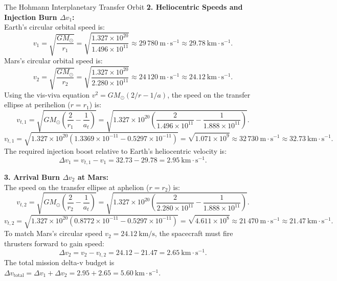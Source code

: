 \begin{workedexample}{The Hohmann Interplanetary Transfer Orbit}
\textbf{2. Heliocentric Speeds and Injection Burn $\Delta v_1$:}\\
Earth's circular orbital speed is:
\[
v_1 = \sqrt{\frac{G M_\odot}{r_1}} = \sqrt{\frac{1.327\times 10^{20}}{1.496\times 10^{11}}} \approx 29\,780\ \mathrm{m\cdot s^{-1}} \approx 29.78\ \mathrm{km\cdot s^{-1}}.
\]
Mars's circular orbital speed is:
\[
v_2 = \sqrt{\frac{G M_\odot}{r_2}} = \sqrt{\frac{1.327\times 10^{20}}{2.280\times 10^{11}}} \approx 24\,120\ \mathrm{m\cdot s^{-1}} \approx 24.12\ \mathrm{km\cdot s^{-1}}.
\]
Using the vis-viva equation $v^2 = G M_\odot(2/r - 1/a)$, the speed on the transfer ellipse at perihelion ($r = r_1$) is:
\[
v_{t,1} = \sqrt{G M_\odot\left(\frac{2}{r_1} - \frac{1}{a_t}\right)} = \sqrt{1.327\times 10^{20}\left( \frac{2}{1.496\times 10^{11}} - \frac{1}{1.888\times 10^{11}} \right)}.
\]
\[
v_{t,1} = \sqrt{1.327\times 10^{20}(1.3369\times 10^{-11} - 0.5297\times 10^{-11})} = \sqrt{1.071\times 10^9} \approx 32\,730\ \mathrm{m\cdot s^{-1}} \approx 32.73\ \mathrm{km\cdot s^{-1}}.
\]
The required injection boost relative to Earth's heliocentric velocity is:
\[
\Delta v_1 = v_{t,1} - v_1 = 32.73 - 29.78 = 2.95\ \mathrm{km\cdot s^{-1}}.
\]

\textbf{3. Arrival Burn $\Delta v_2$ at Mars:}\\
The speed on the transfer ellipse at aphelion ($r = r_2$) is:
\[
v_{t,2} = \sqrt{G M_\odot\left(\frac{2}{r_2} - \frac{1}{a_t}\right)} = \sqrt{1.327\times 10^{20}\left( \frac{2}{2.280\times 10^{11}} - \frac{1}{1.888\times 10^{11}} \right)}.
\]
\[
v_{t,2} = \sqrt{1.327\times 10^{20}(0.8772\times 10^{-11} - 0.5297\times 10^{-11})} = \sqrt{4.611\times 10^8} \approx 21\,470\ \mathrm{m\cdot s^{-1}} \approx 21.47\ \mathrm{km\cdot s^{-1}}.
\]
To match Mars's circular speed $v_2 = 24.12\ \mathrm{km/s}$, the spacecraft must fire thrusters forward to gain speed:
\[
\Delta v_2 = v_2 - v_{t,2} = 24.12 - 21.47 = 2.65\ \mathrm{km\cdot s^{-1}}.
\]
The total mission delta-v budget is $\Delta v_{\text{total}} = \Delta v_1 + \Delta v_2 = 2.95 + 2.65 = 5.60\ \mathrm{km\cdot s^{-1}}$.
\end{workedexample}

